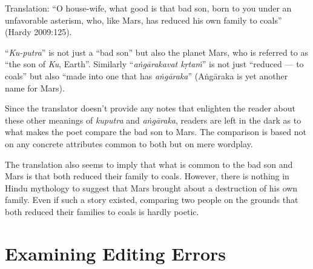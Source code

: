 \begin{myquote}
Translation: “O house-wife, what good is that bad son, born to you under an unfavorable asterism, who, like Mars, has reduced his own family to coals” 
\hfill(Hardy 2009:125).
\end{myquote}

“\textsl{Ku-putra}” is not just a “bad son” but also the planet Mars, who is referred to as “the son of \textsl{Ku}, Earth”. Similarly “\textsl{aṅgārakavat kṛtaṁ}” is not just “reduced --- to coals” but also “made into one that has \textsl{aṅgāraka}” (Aṅgāraka is yet another name for Mars). 

Since the translator doesn’t provide any notes that enlighten the reader about these other meanings of \textsl{kuputra} and \textsl{aṅgāraka}, readers are left in the dark as to what makes the poet compare the bad son to Mars. The comparison is based not on any concrete attributes common to both but on mere wordplay. 

The translation also seems to imply that what is common to the bad son and Mars is that both reduced their family to coals. However, there is nothing in Hindu mythology to suggest that Mars brought about a destruction of his own family. Even if such a story existed, comparing two people on the grounds that both reduced their families to coals is hardly poetic. 

\section*{Examining Editing Errors}


